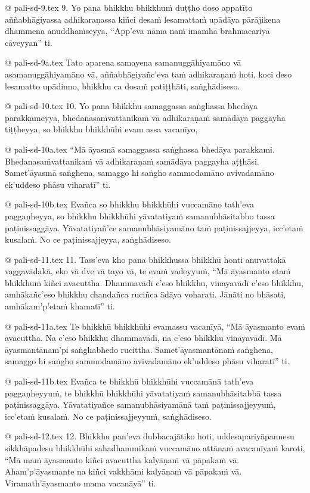 @ pali-sd-9.tex
9. Yo pana bhikkhu bhikkhuṁ duṭṭho doso appatīto aññabhāgiyassa adhikaraṇassa kiñci desaṁ lesamattaṁ upādāya pārājikena dhammena anuddhaṁseyya, “App’eva nāma naṁ imamhā brahmacariyā cāveyyan” ti.

@ pali-sd-9a.tex
Tato aparena samayena samanuggāhiyamāno vā asamanuggāhiyamāno vā, aññabhāgiyañc’eva taṁ adhikaraṇaṁ hoti, koci deso lesamatto upādinno, bhikkhu ca dosaṁ patiṭṭhāti, saṅghādiseso.

@ pali-sd-10.tex
10. Yo pana bhikkhu samaggassa saṅghassa bhedāya parakkameyya, bhedanasaṁvattanikaṁ vā adhikaraṇaṁ samādāya paggayha tiṭṭheyya, so bhikkhu bhikkhūhi evam assa vacanīyo,

@ pali-sd-10a.tex
“Mā āyasmā samaggassa saṅghassa bhedāya parakkami. Bhedanasaṁvattanikaṁ vā adhikaraṇaṁ samādāya paggayha aṭṭhāsi. Samet’āyasmā saṅghena, samaggo hi saṅgho sammodamāno avivadamāno ek’uddeso phāsu viharatī” ti.

@ pali-sd-10b.tex
Evañca so bhikkhu bhikkhūhi vuccamāno tath’eva paggaṇheyya, so bhikkhu bhikkhūhi yāvatatiyaṁ samanubhāsitabbo tassa paṭinissaggāya. Yāvatatiyañ’ce samanubhāsiyamāno taṁ paṭinissajjeyya, icc’etaṁ kusalaṁ. No ce paṭinissajjeyya, saṅghādiseso.

@ pali-sd-11.tex
11. Tass’eva kho pana bhikkhussa bhikkhū honti anuvattakā vaggavādakā, eko vā dve vā tayo vā, te evaṁ vadeyyuṁ, “Mā āyasmanto etaṁ bhikkhuṁ kiñci avacuttha. Dhammavādī c’eso bhikkhu, vinayavādī c’eso bhikkhu, amhākañc’eso bhikkhu chandañca ruciñca ādāya voharati. Jānāti no bhāsati, amhākam’p’etaṁ khamatī” ti.

@ pali-sd-11a.tex
Te bhikkhū bhikkhūhi evamassu vacanīyā, “Mā āyasmanto evaṁ avacuttha. Na c’eso bhikkhu dhammavādī, na c’eso bhikkhu vinayavādī. Mā āyasmantānam’pi saṅghabhedo rucittha. Samet’āyasmantānaṁ saṅghena, samaggo hi saṅgho sammodamāno avivadamāno ek’uddeso phāsu viharatī” ti.

@ pali-sd-11b.tex
Evañca te bhikkhū bhikkhūhi vuccamānā tath’eva paggaṇheyyuṁ, te bhikkhū bhikkhūhi yāvatatiyaṁ samanubhāsitabbā tassa paṭinissaggāya. Yāvatatiyañce samanubhāsiyamānā taṁ paṭinissajjeyyuṁ, icc’etaṁ kusalaṁ. No ce paṭinissajjeyyuṁ, saṅghādiseso.

@ pali-sd-12.tex
12. Bhikkhu pan’eva dubbacajātiko hoti, uddesapariyāpannesu sikkhāpadesu bhikkhūhi sahadhammikaṁ vuccamāno attānaṁ avacanīyaṁ karoti, “Mā maṁ āyasmanto kiñci avacuttha kalyāṇaṁ vā pāpakaṁ vā. Aham’p’āyasmante na kiñci vakkhāmi kalyāṇaṁ vā pāpakaṁ vā. Viramath’āyasmanto mama vacanāyā” ti.

